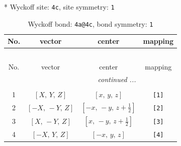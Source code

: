 \documentclass[fleqn,8pt]{jsarticle}
\begin{document}
* Wyckoff site: {\tt 4c}, site symmetry: {\tt 1}
\renewcommand{\arraystretch}{1.2}
\begin{longtable}{cccc}
\caption{Wyckoff bond: {\tt 4a@4c}, bond symmetry: {\tt 1}}
 \\
 \hline \hline
No. & vector & center & mapping \\ \hline \endfirsthead

\multicolumn{3}{l}{\tablename\ \thetable{}} \\
 \hline \hline
No. & vector & center & mapping \\ \hline \endhead

 \hline \hline
\multicolumn{3}{r}{\footnotesize\it continued ...} \\ \endfoot

 \hline \hline
\multicolumn{3}{r}{} \\ \endlastfoot

1 & $\left[ X,\, Y,\, Z \right]$ & $\left[ x,\, y,\, z \right]$ & {\tt [1]} \\ \hline
2 & $\left[ - X,\, - Y,\, Z \right]$ & $\left[ - x,\, - y,\, z + \frac{1}{2} \right]$ & {\tt [2]} \\ \hline
3 & $\left[ X,\, - Y,\, Z \right]$ & $\left[ x,\, - y,\, z + \frac{1}{2} \right]$ & {\tt [3]} \\ \hline
4 & $\left[ - X,\, Y,\, Z \right]$ & $\left[ - x,\, y,\, z \right]$ & {\tt [4]} \\
\end{longtable}
\end{document}
